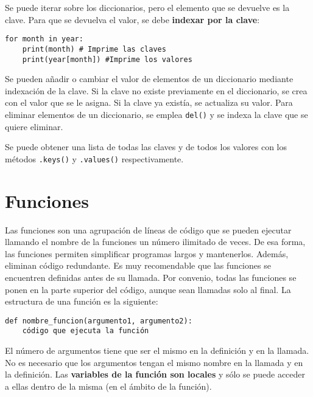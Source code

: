 Se puede iterar sobre los diccionarios, pero el  elemento que se devuelve es la clave. Para que se devuelva el valor, se debe \textbf{indexar por la clave}:
\begin{lstlisting}
for month in year:
	print(month) # Imprime las claves
	print(year[month]) #Imprime los valores
\end{lstlisting}

Se pueden añadir o cambiar el valor de elementos de un diccionario mediante indexación de la clave. Si la clave no existe previamente en el diccionario, se crea con el valor que se le asigna. Si la clave ya existía, se actualiza su valor. Para eliminar elementos de un diccionario, se emplea \texttt{del()} y se indexa la clave que se quiere eliminar.

Se puede obtener una lista de todas las claves y de todos los valores con los métodos \texttt{.keys()} y \texttt{.values()} respectivamente. 

\section{Funciones}
Las funciones son una agrupación de líneas de código que se pueden ejecutar llamando el nombre de la funciones un número ilimitado de veces. De esa forma, las funciones permiten simplificar programas largos y mantenerlos. Además, eliminan código redundante. Es muy recomendable que las funciones se encuentren definidas antes de su llamada. Por convenio, todas las funciones se ponen en la parte superior del código, aunque sean llamadas solo al final. La estructura de una función es la siguiente:
\begin{lstlisting}
def nombre_funcion(argumento1, argumento2):
	código que ejecuta la función
\end{lstlisting}
El número de argumentos tiene que ser el mismo en la definición y en la llamada. No es necesario que los argumentos tengan el mismo nombre en la llamada y en la definición. Las \textbf{variables de la función son locales} y sólo se puede acceder a ellas dentro de la misma (en el ámbito de la función). 

